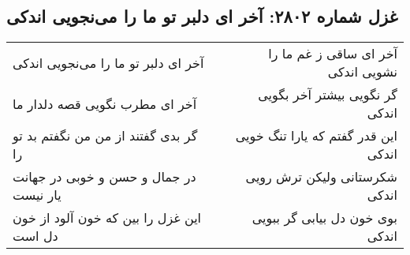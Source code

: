 \begin{center}
\section*{غزل شماره ۲۸۰۲: آخر ای دلبر تو ما را می‌نجویی اندکی}
\label{sec:2802}
\begin{longtable}{l p{0.5cm} r}
آخر ای دلبر تو ما را می‌نجویی اندکی
&&
آخر ای ساقی ز غم ما را نشویی اندکی
\\
آخر ای مطرب نگویی قصه دلدار ما
&&
گر نگویی بیشتر آخر بگویی اندکی
\\
گر بدی گفتند از من من نگفتم بد تو را
&&
این قدر گفتم که یارا تنگ خویی اندکی
\\
در جمال و حسن و خوبی در جهانت یار نیست
&&
شکرستانی ولیکن ترش رویی اندکی
\\
این غزل را بین که خون آلود از خون دل است
&&
بوی خون دل بیابی گر ببویی اندکی
\\
\end{longtable}
\end{center}
